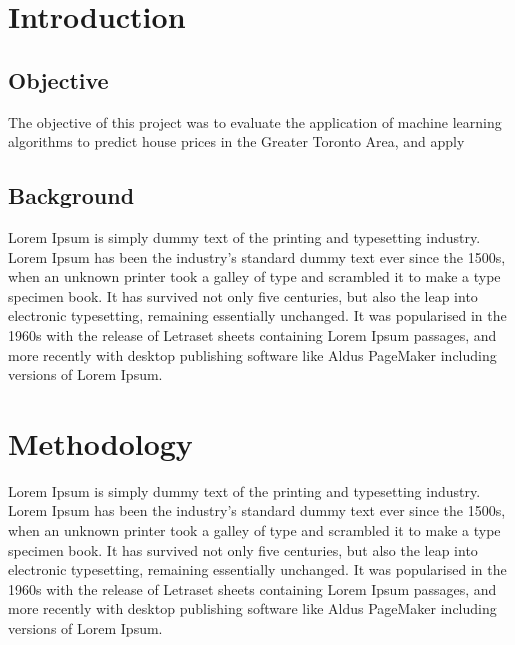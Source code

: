 \documentclass[11pt,]{article}
\begin{document}
\vskip -8.5pt



\noindent  

\hypertarget{introduction}{%
\section{Introduction}\label{introduction}}

\hypertarget{objective}{%
\subsection{Objective}\label{objective}}

The objective of this project was to evaluate the application of machine
learning algorithms to predict house prices in the Greater Toronto Area,
and apply

\hypertarget{background}{%
\subsection{Background}\label{background}}

Lorem Ipsum is simply dummy text of the printing and typesetting
industry. Lorem Ipsum has been the industry's standard dummy text ever
since the 1500s, when an unknown printer took a galley of type and
scrambled it to make a type specimen book. It has survived not only five
centuries, but also the leap into electronic typesetting, remaining
essentially unchanged. It was popularised in the 1960s with the release
of Letraset sheets containing Lorem Ipsum passages, and more recently
with desktop publishing software like Aldus PageMaker including versions
of Lorem Ipsum.

\hypertarget{methodology}{%
\section{Methodology}\label{methodology}}

Lorem Ipsum is simply dummy text of the printing and typesetting
industry. Lorem Ipsum has been the industry's standard dummy text ever
since the 1500s, when an unknown printer took a galley of type and
scrambled it to make a type specimen book. It has survived not only five
centuries, but also the leap into electronic typesetting, remaining
essentially unchanged. It was popularised in the 1960s with the release
of Letraset sheets containing Lorem Ipsum passages, and more recently
with desktop publishing software like Aldus PageMaker including versions
of Lorem Ipsum.
\end{document}
